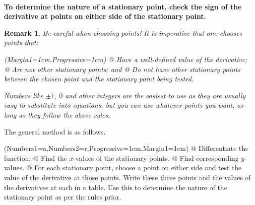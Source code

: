 \documentclass[a4paper,11pt]{article}
\newtheorem*{remark}{Remark}
\begin{document}
\begin{figure}[H]
	\centering
	\\
\end{figure}
\textbf{To determine the nature of a stationary point, check the sign of the derivative at points on either side of the stationary point}.

\begin{remark}\normalfont
	Be careful when choosing points! It is imperative that one chooses points that:
	\vspace{0.15cm}
	\begin{easylist}[itemize]
		\ListProperties(Margin1=1cm,Progressive=1cm)
		@ Have a well-defined value of the derivative;
		@ Are not other stationary points; and
		@ Do not have other stationary points between the chosen point and the stationary point being tested.
	\end{easylist}
\vspace{0.15cm}
\noindent Numbers like $\pm1$, $0$ and other integers are the easiest to use as they are usually easy to substitute into equations, but you can use whatever points you want, as long as they follow the above rules.
\end{remark}

\noindent The general method is as follows.
\vspace{0.15cm}
\begin{easylist}[enumerate]
	\ListProperties(Numbers1=a,Numbers2=r,Progressive=1cm,Margin1=1cm)
	@ Differentiate the function.
	@ Find the $x$-values of the stationary points.
	@ Find corresponding $y$-values.
	@ For each stationary point, choose a point on either side and test the value of the derivative at those points. Write these three points and the values of the derivatives at each in a table. Use this to determine the nature of the stationary point as per the rules prior.
\end{easylist}
\vspace{0.15cm}
\end{document}

